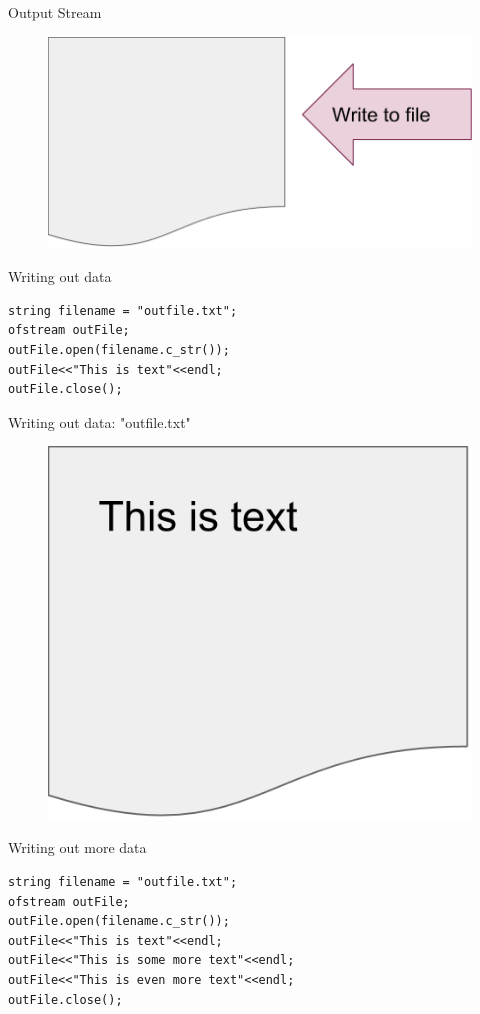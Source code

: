 \documentclass[xcolor={dvipsnames}]{beamer}
\begin{document}
\begin{frame}{Output Stream}
	\begin{figure}
		\includegraphics[width=1\textwidth]{write}
	\end{figure}
\end{frame}

\begin{frame}[fragile]{Writing out data}
\begin{verbatim}
string filename = "outfile.txt";
ofstream outFile;
outFile.open(filename.c_str());
outFile<<"This is text"<<endl;
outFile.close();
\end{verbatim}
\end{frame}

\begin{frame}{Writing out data: "outfile.txt"}
	\begin{figure}
		\includegraphics[width=.8\textwidth]{out}
	\end{figure}
\end{frame}

\begin{frame}[fragile]{Writing out more data}
\begin{verbatim}
string filename = "outfile.txt";
ofstream outFile;
outFile.open(filename.c_str());
outFile<<"This is text"<<endl;
outFile<<"This is some more text"<<endl;
outFile<<"This is even more text"<<endl;
outFile.close();
\end{verbatim}
\end{frame}
\end{document}
